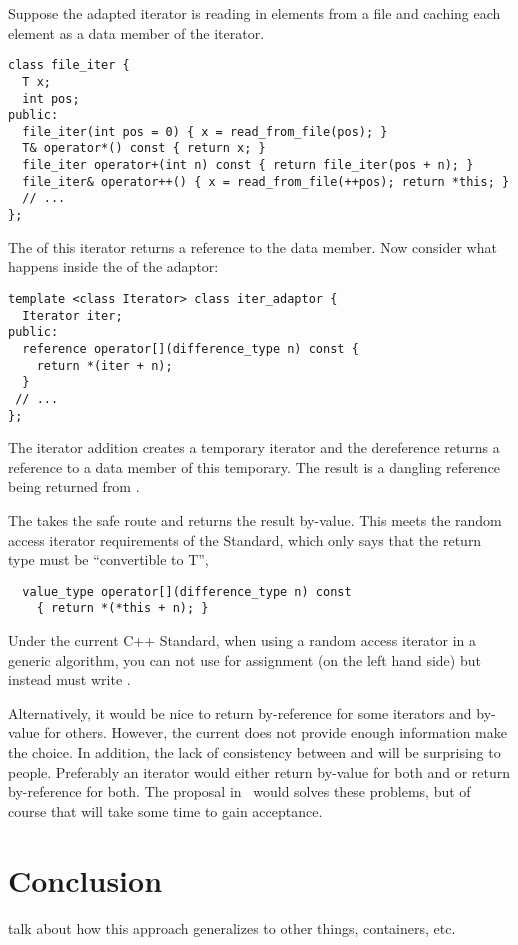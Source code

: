 \documentclass{netobjectdays}
\begin{document}
Suppose the adapted iterator is reading in elements from a file and
caching each element as a data member of the iterator.

{\footnotesize
\begin{verbatim}
class file_iter {
  T x;
  int pos;
public:
  file_iter(int pos = 0) { x = read_from_file(pos); }
  T& operator*() const { return x; }
  file_iter operator+(int n) const { return file_iter(pos + n); }
  file_iter& operator++() { x = read_from_file(++pos); return *this; }
  // ...
};
\end{verbatim}
}

\noindent The  of this iterator returns a reference to
the data member. Now consider what happens inside the
 of the adaptor:

{\footnotesize
\begin{verbatim}
template <class Iterator> class iter_adaptor {
  Iterator iter;
public:
  reference operator[](difference_type n) const {
    return *(iter + n);
  }
 // ...
};
\end{verbatim}
}

\noindent The iterator addition creates a temporary iterator and the
dereference returns a reference to a data member of this
temporary. The result is a dangling reference being returned from
.


The  takes the safe route and returns the
result by-value. This meets the random access iterator requirements of
the Standard, which only says that the return type must be
``convertible to T'',

{\footnotesize
\begin{verbatim}
  value_type operator[](difference_type n) const
    { return *(*this + n); }
\end{verbatim}
}

Under the current {C++} Standard, when using a random access iterator
in a generic algorithm, you can not use  for
assignment (on the left hand side) but instead must write .


Alternatively, it would be nice to return by-reference for some
iterators and by-value for others. However, the current
 does not provide enough information make the
choice. In addition, the lack of consistency between 
and  will be surprising to people. Preferably an
iterator would either return by-value for both  and
 or return by-reference for both.  The proposal
in~\cite{siek01:_improved_iter_cat} would solves these problems, but
of course that will take some time to gain acceptance.

\section{Conclusion}

talk about how this approach generalizes to other things, containers,
etc.





\end{document}
